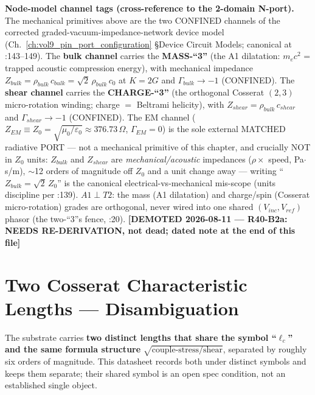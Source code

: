 \noindent
\textbf{Node-model channel tags (cross-reference to the 2-domain N-port).} The mechanical primitives above are the two CONFINED channels of the corrected graded-vacuum-impedance-network device model (Ch.~\ref{ch:vol9_pin_port_configuration} \S Device Circuit Models; canonical at :143--149). The \textbf{bulk channel} carries the \textbf{MASS-``3''} (the A1 dilatation: $m_e c^2$ = trapped acoustic compression energy), with mechanical impedance $Z_{bulk} = \rho_{bulk}\, c_{bulk} = \sqrt{2}\,\rho_{bulk}\, c_0$ at $K = 2G$ and $\Gamma_{bulk} \to -1$ (CONFINED). The \textbf{shear channel} carries the \textbf{CHARGE-``3''} (the orthogonal Cosserat $(2,3)$ micro-rotation winding; charge $=$ Beltrami helicity), with $Z_{shear} = \rho_{bulk}\, c_{shear}$ and $\Gamma_{shear} \to -1$ (CONFINED). The EM channel ($Z_{EM} \equiv Z_0 = \sqrt{\mu_0/\varepsilon_0} \approx 376.73\,\Omega$, $\Gamma_{EM} = 0$) is the sole external MATCHED radiative PORT --- not a mechanical primitive of this chapter, and crucially NOT in $Z_0$ units: $Z_{bulk}$ and $Z_{shear}$ are \emph{mechanical/acoustic} impedances ($\rho \times$ speed, Pa$\cdot$s/m), $\sim$12 orders of magnitude off $Z_0$ and a unit change away --- writing ``$Z_{bulk} = \sqrt{2}\, Z_0$'' is the canonical electrical-vs-mechanical mis-scope (units discipline per :139). $A1 \perp T2$: the mass (A1 dilatation) and charge/spin (Cosserat micro-rotation) grades are orthogonal, never wired into one shared $(V_{inc}, V_{ref})$ phasor (the two-``3''s fence, :20). \textbf{[DEMOTED 2026-08-11 --- R40-B2a: NEEDS RE-DERIVATION, not dead; dated note at the end of this file]}

\section{Two Cosserat Characteristic Lengths --- Disambiguation}
\label{sec:vol9_mech_two_lc}

The substrate carries \textbf{two distinct lengths that share the symbol ``$\ell_c$'' and the same formula structure} $\sqrt{\text{couple-stress}/\text{shear}}$, separated by roughly six orders of magnitude. This datasheet records both under distinct symbols and keeps them separate; their shared symbol is an open spec condition, not an established single object.

